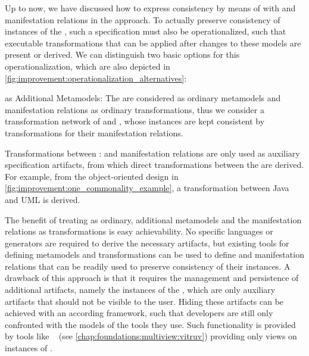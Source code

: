 Up to now, we have discussed how to express consistency by means of \conceptmetamodels with \commonalities and manifestation relations in the \commonalities approach.
To actually preserve consistency of instances of the \concretemetamodels, such a specification must also be operationalized, such that executable transformations that can be applied after changes to these models are present or derived.
We can distinguish two basic options for this operationalization, which are also depicted in \autoref{fig:improvement:operationalization_alternatives}:
\begin{properdescription}
    \item[\ConceptMetamodels as Additional Metamodels:] The \conceptmetamodels are considered as ordinary metamodels and manifestation relations as ordinary transformations, thus we consider a transformation network of \concretemetamodels and \conceptmetamodels, whose instances are kept consistent by transformations for their manifestation relations. %
    \item[Transformations between \ConcreteMetamodels:] \Conceptmetamodels and manifestation relations are only used as auxiliary specification artifacts, from which direct transformations between the \concretemetamodels are derived. For example, from the object-oriented design \conceptmetamodel in \autoref{fig:improvement:one_commonality_example}, a transformation between Java and \gls{UML} is derived.
\end{properdescription}

The benefit of treating \conceptmetamodels as ordinary, additional metamodels and the manifestation relations as transformations is easy achievability.
No specific languages or generators are required to derive the necessary artifacts, but existing tools for defining metamodels and transformations can be used to define \conceptmetamodels and manifestation relations that can be readily used to preserve consistency of their instances.
A drawback of this approach is that it requires the management and persistence of additional artifacts, namely the instances of the \conceptmetamodels, which are only auxiliary artifacts that should not be visible to the user.
Hiding these artifacts can be achieved with an according framework, such that developers are still only confronted with the models of the tools they use.
Such functionality is provided by tools like \vitruv~ (see \autoref{chap:foundations:multiview:vitruv}) providing only views on instances of \concretemetamodels.

